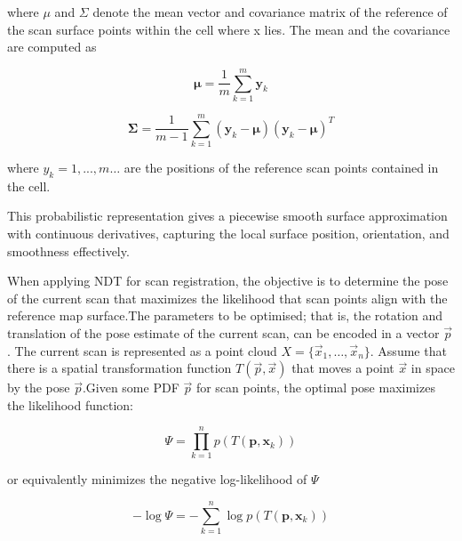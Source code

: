 where $\mu$ and $\Sigma$ denote the mean vector and covariance matrix of the reference of the scan surface points within the cell where x lies. The mean and the covariance are computed as 

\begin{equation}
\mathbf{\mu} = \frac{1}{m} \sum_{k=1}^{m} \mathbf{y}_k
\end{equation}

\begin{equation}
\mathbf{\Sigma} = \frac{1}{m - 1} \sum_{k=1}^{m} (\mathbf{y}_k - \mathbf{\mu})(\mathbf{y}_k - \mathbf{\mu})^T
\end{equation}

where $y_k = 1 ,..., m  \ldots$  are the positions of the reference scan points contained in the cell.

This probabilistic representation gives a piecewise smooth surface approximation with continuous derivatives, capturing the local surface position, orientation, and smoothness effectively.

When applying NDT for scan registration, the objective is to determine the pose of the current scan that maximizes the likelihood that scan points align with the reference map surface.The parameters to be optimised; that is, the rotation and translation of the pose estimate of the current scan, can be encoded in a vector $\vec{p}$. The current scan is represented as a point cloud $X = \{\vec{x}_1, \dots, \vec{x}_n\}$. Assume that there is a spatial transformation function $T(\vec{p}, \vec{x})$ that moves a point $\vec{x}$ in space by the pose $\vec{p}$.Given some PDF $\vec{p}$ for scan points, the optimal pose  maximizes the likelihood function:


\begin{equation}
\Psi = \prod_{k=1}^{n} p(T(\mathbf{p}, \mathbf{x}_k))
\end{equation}

or equivalently minimizes the negative log-likelihood of $\Psi$

\begin{equation}
-\log \Psi = -\sum_{k=1}^{n} \log p(T(\mathbf{p}, \mathbf{x}_k))
\end{equation}

